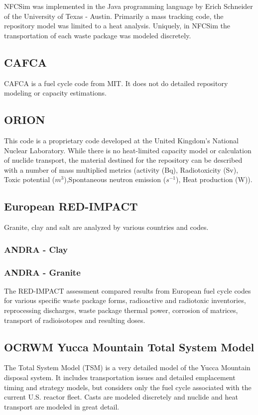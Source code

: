 NFCSim was implemented in the Java programming language by Erich Schneider of the 
University of Texas - Austin. Primarily a mass tracking code, the repository 
model was limited to a heat analysis. Uniquely, in NFCSim the transportation of 
each waste package was modeled discretely. \cite{schneider_nfcsim_2004}

\subsection{CAFCA}

CAFCA is a fuel cycle code from MIT. It does not do detailed repository modeling 
or capacity estimations.


\subsection{ORION} This code is a proprietary code developed at the United
Kingdom's National Nuclear Laboratory. While there is no heat-limited capacity 
model or calculation of nuclide transport, the material destined for the 
repository can be described with a number of mass multiplied metrics (activity 
(Bq), Radiotoxicity (Sv),  Toxic potential ($m^3$),Spontaneous neutron emission 
($s^{-1}$), Heat production (W)).

\subsection{European RED-IMPACT} Granite, clay and salt are analyzed by various
countries and codes.

\subsubsection{ANDRA - Clay}

\subsubsection{ANDRA - Granite}


The RED-IMPACT assessment compared
results from European fuel cycle codes for various specific waste package
forms, radioactive and radiotoxic inventories, reprocessing discharges,  waste
package thermal power, corrosion of matrices, transport of radioisotopes and
resulting doses.


\subsection{OCRWM Yucca Mountain Total System Model} The Total System Model
(TSM) is a very detailed model of the Yucca Mountain disposal system. It
includes transportation issues and detailed emplacement timing and strategy
models, but considers only the fuel cycle associated with the current  U.S.
reactor fleet. Casts are modeled discretely and nuclide and heat transport are
modeled in great detail.\cite{turner_discrete_2010} 

